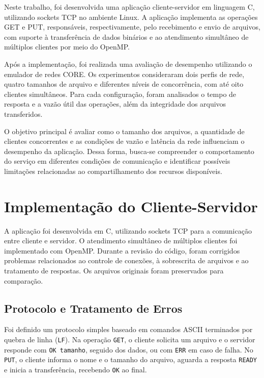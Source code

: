 \documentclass[12pt]{article}
\begin{document}
Neste trabalho, foi desenvolvida uma aplicação cliente-servidor em linguagem C, utilizando sockets TCP no ambiente Linux. A aplicação implementa as operações GET e PUT, responsáveis, respectivamente, pelo recebimento e envio de arquivos, com suporte à transferência de dados binários e ao atendimento simultâneo de múltiplos clientes por meio do OpenMP.

Após a implementação, foi realizada uma avaliação de desempenho utilizando o emulador de redes CORE. Os experimentos consideraram dois perfis de rede, quatro tamanhos de arquivo e diferentes níveis de concorrência, com até oito clientes simultâneos. Para cada configuração, foram analisados o tempo de resposta e a vazão útil das operações, além da integridade dos arquivos transferidos.

O objetivo principal é avaliar como o tamanho dos arquivos, a quantidade de clientes concorrentes e as condições de vazão e latência da rede influenciam o desempenho da aplicação. Dessa forma, busca-se compreender o comportamento do serviço em diferentes condições de comunicação e identificar possíveis limitações relacionadas ao compartilhamento dos recursos disponíveis.


\section{Implementação do Cliente-Servidor}
\label{sec:implementacao}

A aplicação foi desenvolvida em C, utilizando sockets TCP para a comunicação entre cliente e servidor. O atendimento simultâneo de múltiplos clientes foi implementado com OpenMP. Durante a revisão do código, foram corrigidos problemas relacionados ao controle de conexões, à sobrescrita de arquivos e ao tratamento de respostas. Os arquivos originais foram preservados para comparação.

\subsection{Protocolo e Tratamento de Erros}

Foi definido um protocolo simples baseado em comandos ASCII terminados por quebra de linha (\texttt{LF}). Na operação \texttt{GET}, o cliente solicita um arquivo e o servidor responde com \texttt{OK tamanho}, seguido dos dados, ou com \texttt{ERR} em caso de falha. No \texttt{PUT}, o cliente informa o nome e o tamanho do arquivo, aguarda a resposta \texttt{READY} e inicia a transferência, recebendo \texttt{OK} ao final.
\end{document}
